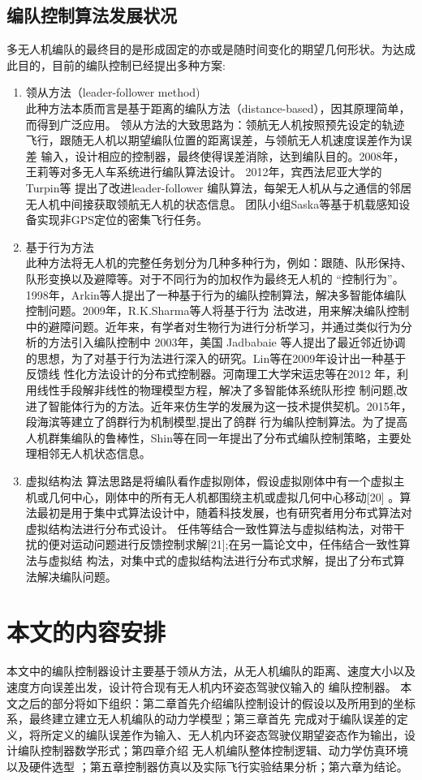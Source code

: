 \subsection{编队控制算法发展状况}
多无人机编队的最终目的是形成固定的亦或是随时间变化的期望几何形状。为达成此目的，目前的编队控制已经提出多种方案:
\begin{enumerate}
    \item 领从方法（leader-follower method)\\
        此种方法本质而言是基于距离的编队方法（distance-based），因其原理简单，而得到广泛应用。
        领从方法的大致思路为：领航无人机按照预先设定的轨迹飞行，跟随无人机以期望编队位置的距离误差，与领航无人机速度误差作为误差
        输入，设计相应的控制器，最终使得误差消除，达到编队目的。2008年，王莉等对多无人车系统进行编队算法设计。\cite{WangLi2008}
        2012年，宾西法尼亚大学的Turpin等
        提出了改进leader-follower 编队算法，每架无人机从与之通信的邻居无人机中间接获取领航无人机的状态信息。\cite{Turpin2012Trajectory}
        团队小组Saska等基于机载感知设备实现非GPS定位的密集飞行任务。\cite{Saska2017System}
    \item 基于行为方法\\
        此种方法将无人机的完整任务划分为几种多种行为，例如：跟随、队形保持、队形变换以及避障等。对于不同行为的加权作为最终无人机的
        “控制行为”。1998年，Arkin等人提出了一种基于行为的编队控制算法，解决多智能体编队控制问题。2009年，R.K.Sharma等人将基于行为
        法改进，用来解决编队控制中的避障问题。近年来，有学者对生物行为进行分析学习，并通过类似行为分析的方法引入编队控制中
        2003年，美国 Jadbabaie 等人提出了最近邻近协调的思想，为了对基于行为法进行深入的研究。Lin等在2009年设计出一种基于反馈线
        性化方法设计的分布式控制器。河南理工大学宋运忠等在2012 年，利用线性手段解非线性的物理模型方程，解决了多智能体系统队形控
        制问题,改进了智能体行为的方法。近年来仿生学的发展为这一技术提供契机。2015年，段海滨等建立了鸽群行为机制模型,提出了鸽群
        行为编队控制算法。为了提高人机群集编队的鲁棒性，Shin等在同一年提出了分布式编队控制策略，主要处理相邻无人机状态信息。
    \item 虚拟结构法
        算法思路是将编队看作虚拟刚体，假设虚拟刚体中有一个虚拟主机或几何中心，刚体中的所有无人机都围绕主机或虚拟几何中心移动[20]
        。算法最初是用于集中式算法设计中，随着科技发展，也有研究者用分布式算法对虚拟结构法进行分布式设计。
        任伟等结合一致性算法与虚拟结构法，对带干扰的便对运动问题进行反馈控制求解[21];在另一篇论文中，任伟结合一致性算法与虚拟结
        构法，对集中式的虚拟结构法进行分布式求解，提出了分布式算法解决编队问题。
\end{enumerate}
\section{本文的内容安排}
本文中的编队控制器设计主要基于领从方法，从无人机编队的距离、速度大小以及速度方向误差出发，设计符合现有无人机内环姿态驾驶仪输入的
编队控制器。
本文之后的部分将如下组织：第二章首先介绍编队控制设计的假设以及所用到的坐标系，最终建立建立无人机编队的动力学模型；第三章首先
完成对于编队误差的定义，将所定义的编队误差作为输入、无人机内环姿态驾驶仪期望姿态作为输出，设计编队控制器数学形式；第四章介绍
无人机编队整体控制逻辑、动力学仿真环境以及硬件选型 ；第五章控制器仿真以及实际飞行实验结果分析；第六章为结论。
